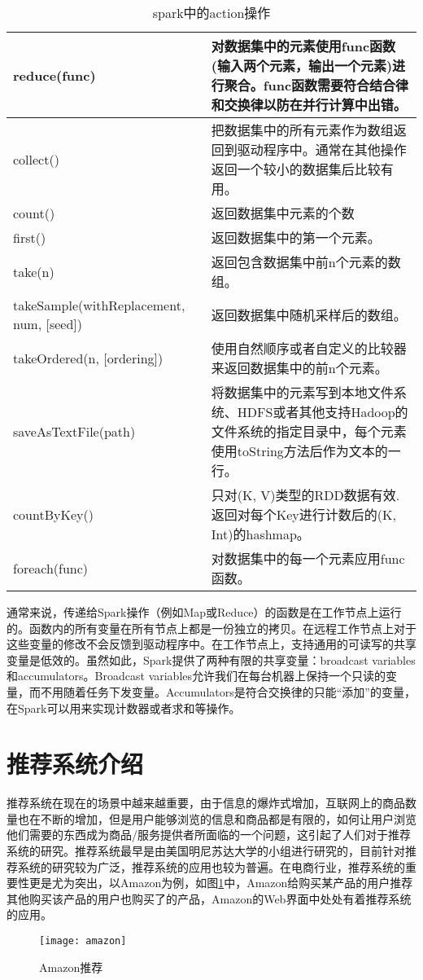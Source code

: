 \begin{table}[htbp]
\centering
\caption{spark中的action操作} \label{spark:action}
\begin{tabular}{|p{5cm}|p{10cm}|}
    \hline
    reduce(func) & 对数据集中的元素使用func函数(输入两个元素，输出一个元素)进行聚合。func函数需要符合结合律和交换律以防在并行计算中出错。\\     \hline
    collect() & 把数据集中的所有元素作为数组返回到驱动程序中。通常在其他操作返回一个较小的数据集后比较有用。\\ \hline
    count() &  返回数据集中元素的个数\\ \hline
    first() &  返回数据集中的第一个元素。\\ \hline
    take(n) & 返回包含数据集中前n个元素的数组。\\ \hline
    takeSample(withReplacement, num, [seed]) & 返回数据集中随机采样后的数组。\\ \hline
    takeOrdered(n, [ordering]) & 使用自然顺序或者自定义的比较器来返回数据集中的前n个元素。\\ \hline
    saveAsTextFile(path) & 将数据集中的元素写到本地文件系统、HDFS或者其他支持Hadoop的文件系统的指定目录中，每个元素使用toString方法后作为文本的一行。\\ \hline
    countByKey() & 只对(K, V)类型的RDD数据有效. 返回对每个Key进行计数后的(K, Int)的hashmap。\\ \hline
    foreach(func) & 对数据集中的每一个元素应用func函数。\\ \hline
    \hline
\end{tabular}
\end{table}

通常来说，传递给Spark操作（例如Map或Reduce）的函数是在工作节点上运行的。函数内的所有变量在所有节点上都是一份独立的拷贝。在远程工作节点上对于这些变量的修改不会反馈到驱动程序中。在工作节点上，支持通用的可读写的共享变量是低效的。虽然如此，Spark提供了两种有限的共享变量：broadcast variables和accumulators。Broadcast variables允许我们在每台机器上保持一个只读的变量，而不用随着任务下发变量。Accumulators是符合交换律的只能“添加”的变量，在Spark可以用来实现计数器或者求和等操作。

\section{推荐系统介绍}
推荐系统在现在的场景中越来越重要，由于信息的爆炸式增加，互联网上的商品数量也在不断的增加，但是用户能够浏览的信息和商品都是有限的，如何让用户浏览他们需要的东西成为商品/服务提供者所面临的一个问题，这引起了人们对于推荐系统的研究。推荐系统最早是由美国明尼苏达大学的小组进行研究的，目前针对推荐系统的研究较为广泛，推荐系统的应用也较为普遍。在电商行业，推荐系统的重要性更是尤为突出，以Amazon为例，如图\ref{fig:amazon}中，Amazon给购买某产品的用户推荐其他购买该产品的用户也购买了的产品，Amazon的Web界面中处处有着推荐系统的应用。
\begin{figure}[ht]
\centering
\texttt{[image: amazon]}
\caption{Amazon推荐}\label{fig:amazon}
\end{figure}

